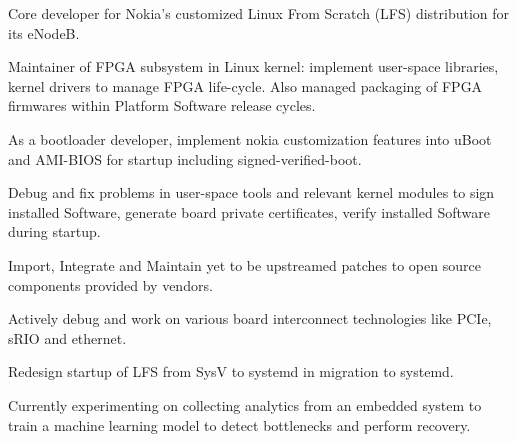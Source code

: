     {%
		\begin{cvitems} %
		\item {Core developer for Nokia's customized Linux From Scratch (LFS) distribution for its eNodeB.}
		\item {Maintainer of FPGA subsystem in Linux kernel: implement user-space libraries, kernel drivers to manage FPGA life-cycle. Also managed packaging of FPGA firmwares within Platform Software release cycles.}
		\item {As a bootloader developer, implement nokia customization features into uBoot and AMI-BIOS for startup including signed-verified-boot.}
		\item {Debug and fix problems in user-space tools and relevant kernel modules to sign installed Software, generate board private certificates, verify installed Software during startup.}
		\item {Import, Integrate and Maintain yet to be upstreamed patches to open source components provided by vendors.}
		\item {Actively debug and work on various board interconnect technologies like PCIe, sRIO and ethernet.}
		\item {Redesign startup of LFS from SysV to systemd in migration to systemd.}
		\item {Currently experimenting on collecting analytics from an embedded system to train a machine learning model to detect bottlenecks and perform recovery.}
		\end{cvitems}
  }
